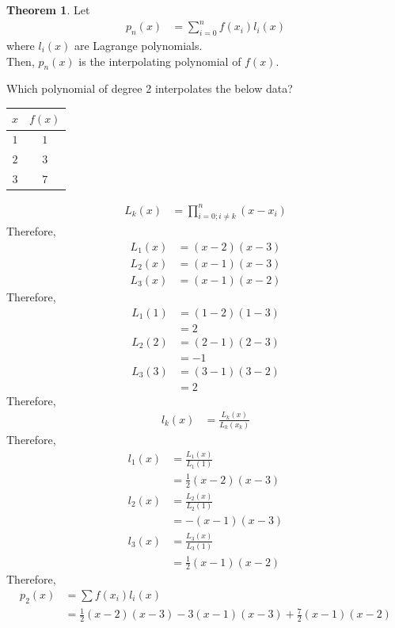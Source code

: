\documentclass[fleqn, a4paper, 12pt, twoside, titlepage]{article}
\theoremstyle{definition}
\theoremstyle{theorem}
\newtheorem{theorem}{Theorem}
\begin{document}
\begin{theorem}
	Let
	\begin{align*}
		p_n(x) & = \sum\limits_{i = 0}^{n} f(x_i) l_i(x)
	\end{align*}
	where $l_i(x)$ are Lagrange polynomials.\\
	Then, $p_n(x)$ is the interpolating polynomial of $f(x)$.
\end{theorem}

\begin{question}
	Which polynomial of degree 2 interpolates the below data?
	\begin{table}[H]
		\centering
		\begin{tabular}{c|c}
			$x$ & $f(x)$\\
			\hline
			$1$ & $1$\\
			$2$ & $3$\\
			$3$ & $7$\\
		\end{tabular}
	\end{table}
\end{question}

\begin{solution}
	\begin{align*}
		L_k(x) & = \prod\limits_{i = 0 ; i \neq k}^{n} (x - x_i)
	\end{align*}
	Therefore,
	\begin{align*}
		L_1(x) & = (x - 2) (x - 3) \\
		L_2(x) & = (x - 1) (x - 3) \\
		L_3(x) & = (x - 1) (x - 2)
	\end{align*}
	Therefore,
	\begin{align*}
		L_1(1) & = (1 - 2) (1 - 3) \\
                       & = 2               \\
		L_2(2) & = (2 - 1) (2 - 3) \\
                       & = -1              \\
		L_3(3) & = (3 - 1) (3 - 2) \\
                       & = 2
	\end{align*}
	Therefore,
	\begin{align*}
		l_k(x) & = \frac{L_k(x)}{L_k(x_k)}
	\end{align*}
	Therefore,
	\begin{align*}
		l_1(x) & = \frac{L_1(x)}{L_1(1)}       \\
                       & = \frac{1}{2} (x - 2) (x - 3) \\
		l_2(x) & = \frac{L_2(x)}{L_2(1)}       \\
                       & = -(x - 1) (x - 3)            \\
		l_3(x) & = \frac{L_3(x)}{L_3(1)}       \\
                       & = \frac{1}{2} (x - 1) (x - 2)
	\end{align*}
	Therefore,
	\begin{align*}
		p_2(x) & = \sum f(x_i) l_i(x) \\
                       & = \frac{1}{2} (x - 2) (x - 3) - 3 (x - 1) (x - 3) + \frac{7}{2} (x - 1) (x - 2)
	\end{align*}
\end{solution}
\end{document}
